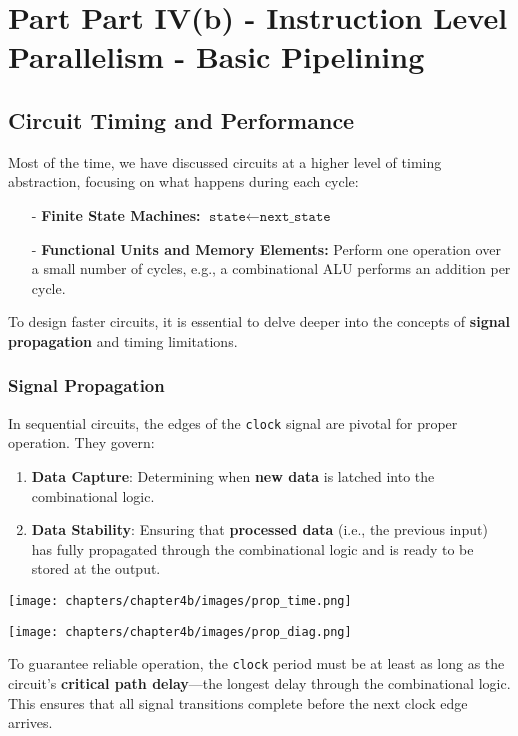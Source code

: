 \chapter{Part Part IV(b) - Instruction Level Parallelism - Basic Pipelining}
\section{Circuit Timing and Performance}

Most of the time, we have discussed circuits at a higher level of timing abstraction, focusing on what happens during each cycle:
\begin{itemize}
    \item[-] \textbf{Finite State Machines:} $\texttt{state} \gets \texttt{next\_state}$
    \item[-] \textbf{Functional Units and Memory Elements:} Perform one operation over a small number of cycles, e.g., a combinational ALU performs an addition per cycle.
\end{itemize}

To design faster circuits, it is essential to delve deeper into the concepts of \textbf{signal propagation} and timing limitations.
\subsection{Signal Propagation}

In sequential circuits, the edges of the \texttt{clock} signal are pivotal for proper operation. They govern:

\begin{enumerate}
    \item \textbf{Data Capture}: Determining when \textbf{new data} is latched into the combinational logic.
    \item \textbf{Data Stability}: Ensuring that \textbf{processed data} (i.e., the previous input) has fully propagated through the combinational logic and is ready to be stored at the output.
\end{enumerate}

\begin{minipage}[htp]{0.45\textwidth}
    \begin{center}
        \texttt{[image: chapters/chapter4b/images/prop\_time.png]}
    \end{center}
\end{minipage}
\hfill
\vline
\hfill
\begin{minipage}[htp]{0.45\textwidth}
    \begin{center}
        \texttt{[image: chapters/chapter4b/images/prop\_diag.png]}
    \end{center}
\end{minipage}
To guarantee reliable operation, the \texttt{clock} period must be at least as long as the circuit's \textbf{critical path delay}—the longest delay through the combinational logic. This ensures that all signal transitions complete before the next clock edge arrives.

